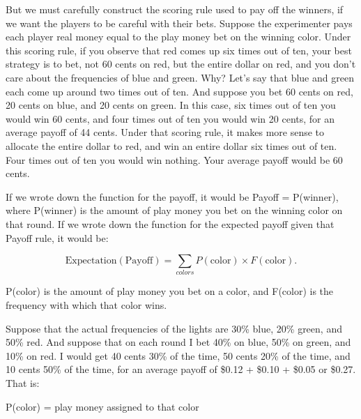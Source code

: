 {
 But we must carefully construct the scoring rule used to pay off
the winners, if we want the players to be careful with their bets.
Suppose the experimenter pays each player real money equal to the play
money bet on the winning color. Under this scoring rule, if you observe
that red comes up six times out of ten, your best strategy is to bet,
not 60 cents on red, but the entire dollar on red, and you
don't care about the frequencies of blue and green.
Why? Let's say that blue and green each come up around
two times out of ten. And suppose you bet 60 cents on red, 20 cents on
blue, and 20 cents on green. In this case, six times out of ten you
would win 60 cents, and four times out of ten you would win 20 cents,
for an average payoff of 44 cents. Under that scoring rule, it makes
more sense to allocate the entire dollar to red, and win an entire
dollar six times out of ten. Four times out of ten you would win
nothing. Your average payoff would be 60 cents.}

{
 If we wrote down the function for the payoff, it would be Payoff =
P(winner), where P(winner) is the amount of play money you bet on the
winning color on that round. If we wrote down the function for the
expected payoff given that Payoff rule, it would be:}

\begin{equation*}
  \mathrm{Expectation}(\mathrm{Payof}\mathrm{f}) = \sum_{colors} P(\mathrm{color})\times F(\mathrm{color}).
\end{equation*}



\bigskip

{
 P(color) is the amount of play money you bet on a color, and
F(color) is the frequency with which that color wins.}

{
 Suppose that the actual frequencies of the lights are 30\% blue,
20\% green, and 50\% red. And suppose that on each round I bet 40\% on
blue, 50\% on green, and 10\% on red. I would get 40 cents 30\% of the
time, 50 cents 20\% of the time, and 10 cents 50\% of the time, for an
average payoff of \$0.12 + \$0.10 + \$0.05 or \$0.27. That is:}

{\centering
 P(color) = play money assigned to that color
\par}


